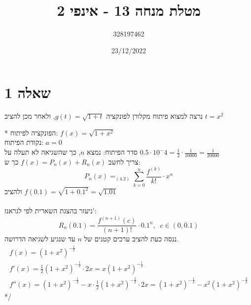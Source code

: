 \documentclass{article}
\title{מטלת מנחה 13 - אינפי 2}
\author{328197462}
\date{23/12/2022}
\DeclareMathOperator*{\equals}{=}
\begin{document}
\long{}
\maketitle

\section*{שאלה 1}
נרצה למצוא פיתוח מקלורן לפונקציה $g(t)=\sqrt{1+t}$,
ולאחר מכן להציב $t=x^2$


\/*
הפונקציה לפיתוח: $f(x)=\sqrt{1+x^2}$ \\
נקודת הפיתוח: $a=0$ \\
סדר הפיתוח: נמצא $n$,
כך שהשגיאה לא תעלה על $0.5\cdot 10^-4=\frac{1}{2}\cdot \frac{1}{10000}=\frac{1}{20000}$ \\
צריך לחשב $f(x)=P_n(x)+R_n(x)$ כך ש:
\[
    P_n(x) \equals_{(4.2)}\sum_{k=0}^n \frac{f^{(k)}}{k!}\cdot x^n
\]
ולהציב $f(0.1)=\sqrt{1+0.1^2}=\sqrt{1.01}$
\\\\
ניעזר בהצגת השארית לפי לגראנז': \\
\[
    R_n(0.1)=\frac{f^{(n+1)}(c)}{(n+1)!}\cdot {0.1}^n, \;\; c\in (0,0.1)
\]
ננסה כעת להציב ערכים קטנים של $n$ עד שנגיע לשגיאה הדרושה.
\[
    \begin{matrix}
        f(x) = (1+x^2)^{-\frac{1}{2}}                                                \\
        f'(x) = \frac{1}{2}(1+x^2)^{-\frac{1}{2}} \cdot 2x = x(1+x^2)^{-\frac{1}{2}} \\
        f''(x) = (1+x^2)^{-\frac{1}{2}} - x \cdot \frac{1}{2}(1+x^2)^{-\frac{3}{2}} \cdot 2x = (1+x^2)^{-\frac{1}{2}} - x^2(1+x^2)^{-\frac{3}{2}}
    \end{matrix}
\]
*/
\end{document}
